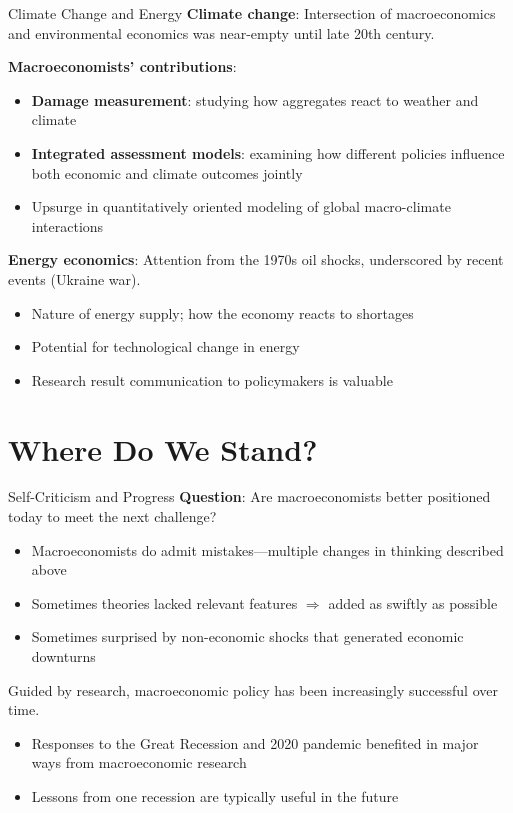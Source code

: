 \documentclass[blue]{beamer}
\begin{document}
\begin{frame}{Climate Change and Energy}
	\textbf{Climate change}: Intersection of macroeconomics and environmental economics was near-empty until late 20th century.
	
	\textbf{Macroeconomists' contributions}:
		\vspace{-6pt}
	\begin{itemize}
		\item \textbf{Damage measurement}: studying how aggregates react to weather and climate
		\item \textbf{Integrated assessment models}: examining how different policies influence both economic and climate outcomes jointly
		\item Upsurge in quantitatively oriented modeling of global macro-climate interactions
	\end{itemize}
	

	\textbf{Energy economics}: Attention from the 1970s oil shocks, underscored by recent events (Ukraine war).
		\vspace{-6pt}
	\begin{itemize}
		\item Nature of energy supply; how the economy reacts to shortages
		\item Potential for technological change in energy
		\item Research result communication to policymakers is valuable
	\end{itemize}
\end{frame}

\section{Where Do We Stand?}

\begin{frame}{Self-Criticism and Progress}
	\textbf{Question}: Are macroeconomists better positioned today to meet the next challenge?
	
	\begin{itemize}
		\item Macroeconomists {do} admit mistakes---multiple changes in thinking described above
		\item Sometimes theories lacked relevant features $\Rightarrow$ added as swiftly as possible
		\item Sometimes surprised by non-economic shocks that generated economic downturns
	\end{itemize}
	

	Guided by research, macroeconomic policy has been {increasingly successful} over time.
	\vspace{-6pt}
	\begin{itemize}
		\item Responses to the Great Recession and 2020 pandemic benefited in major ways from macroeconomic research
		\item Lessons from one recession are typically useful in the future
	\end{itemize}
\end{frame}
\end{document}
